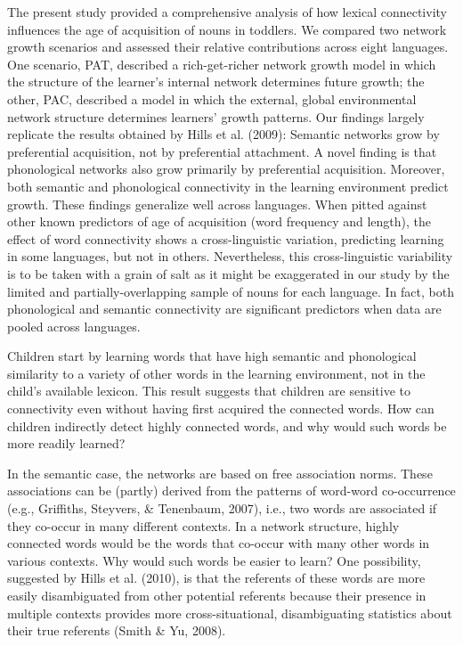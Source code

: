 \documentclass[english,floatsintext,man]{apa6}
\theoremstyle{definition}
\theoremstyle{definition}
\theoremstyle{definition}
\theoremstyle{remark}
\begin{document}
The present study provided a comprehensive analysis of how lexical
connectivity influences the age of acquisition of nouns in toddlers. We
compared two network growth scenarios and assessed their relative
contributions across eight languages. One scenario, PAT, described a
rich-get-richer network growth model in which the structure of the
learner's internal network determines future growth; the other, PAC,
described a model in which the external, global environmental network
structure determines learners' growth patterns. Our findings largely
replicate the results obtained by Hills et al. (2009): Semantic networks
grow by preferential acquisition, not by preferential attachment. A
novel finding is that phonological networks also grow primarily by
preferential acquisition. Moreover, both semantic and phonological
connectivity in the learning environment predict growth. These findings
generalize well across languages. When pitted against other known
predictors of age of acquisition (word frequency and length), the effect
of word connectivity shows a cross-linguistic variation, predicting
learning in some languages, but not in others. Nevertheless, this
cross-linguistic variability is to be taken with a grain of salt as it
might be exaggerated in our study by the limited and
partially-overlapping sample of nouns for each language. In fact, both
phonological and semantic connectivity are significant predictors when
data are pooled across languages.

Children start by learning words that have high semantic and
phonological similarity to a variety of other words in the learning
environment, not in the child's available lexicon. This result suggests
that children are sensitive to connectivity even without having first
acquired the connected words. How can children indirectly detect highly
connected words, and why would such words be more readily learned?

In the semantic case, the networks are based on free association norms.
These associations can be (partly) derived from the patterns of
word-word co-occurrence (e.g., Griffiths, Steyvers, \& Tenenbaum, 2007),
i.e., two words are associated if they co-occur in many different
contexts. In a network structure, highly connected words would be the
words that co-occur with many other words in various contexts. Why would
such words be easier to learn? One possibility, suggested by Hills et
al. (2010), is that the referents of these words are more easily
disambiguated from other potential referents because their presence in
multiple contexts provides more cross-situational, disambiguating
statistics about their true referents (Smith \& Yu, 2008).
\end{document}
